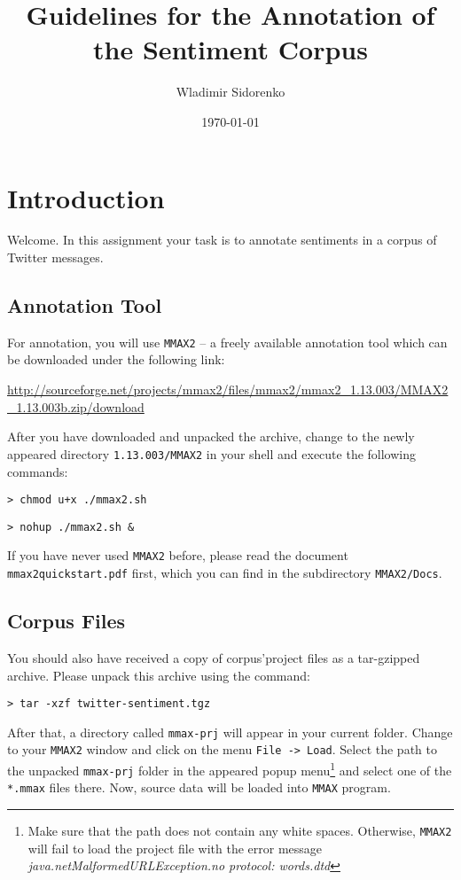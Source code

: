 \documentclass[11pt,a4paper]{article}
\author{Wladimir Sidorenko}
\date{\today}
\title{Guidelines for the Annotation of the Sentiment Corpus}
\begin{document}
\maketitle{}
\section{Introduction}
Welcome. In this assignment your task is to annotate sentiments in a
corpus of Twitter messages.

\subsection{Annotation Tool}

For annotation, you will use \texttt{MMAX2} -- a freely available
annotation tool which can be downloaded under the following link:

\url{http://sourceforge.net/projects/mmax2/files/mmax2/mmax2_1.13.003/MMAX2_1.13.003b.zip/download}

After you have downloaded and unpacked the archive, change to the
newly appeared directory \texttt{1.13.003/MMAX2} in your shell and
execute the following commands:

\texttt{> chmod u+x ./mmax2.sh}

\texttt{> nohup ./mmax2.sh \&}

{\setlength{\parindent}{0pt} If you have never used \texttt{MMAX2}
  before, please read the document \texttt{mmax2quickstart.pdf} first,
  which you can find in the subdirectory \texttt{MMAX2/Docs}.}

\subsection{Corpus Files}

You should also have received a copy of corpus'project files as a
tar-gzipped archive.  Please unpack this archive using the command:

\texttt{> tar -xzf twitter-sentiment.tgz}

{\setlength{\parindent}{0pt} After that, a directory called
  \texttt{mmax-prj} will appear in your current folder.  Change to
  your \texttt{MMAX2} window and click on the menu \texttt{File ->
    Load}.  Select the path to the unpacked \texttt{mmax-prj} folder
  in the appeared popup menu\footnote{Make sure that the path does not
    contain any white spaces. Otherwise, \texttt{MMAX2} will fail to
    load the project file with the error message
    \emph{java.netMalformedURLException.no protocol: words.dtd}} and
  select one of the \texttt{*.mmax} files there. Now, source data will
  be loaded into \texttt{MMAX} program.}
\end{document}
